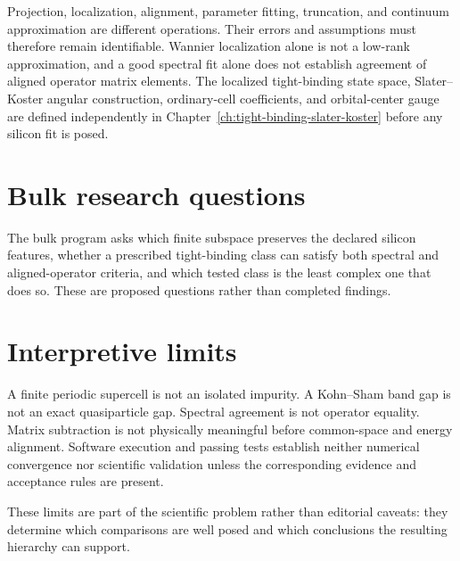 Projection, localization, alignment, parameter fitting, truncation, and
continuum approximation are different operations. Their errors and assumptions
must therefore remain identifiable. Wannier localization alone is not a
low-rank approximation, and a good spectral fit alone does not establish
agreement of aligned operator matrix elements. The localized tight-binding
state space, Slater--Koster angular construction, ordinary-cell coefficients,
and orbital-center gauge are defined independently in
Chapter~\ref{ch:tight-binding-slater-koster} before any silicon fit is posed.

\section{Bulk research questions}


The bulk program asks which finite subspace preserves the declared silicon
features, whether a prescribed tight-binding class can satisfy both spectral
and aligned-operator criteria, and which tested class is the least complex one
that does so. These are proposed questions rather than completed findings.

\section{Interpretive limits}

A finite periodic supercell is not an isolated impurity. A Kohn--Sham band gap
is not an exact quasiparticle gap. Spectral agreement is not operator equality.
Matrix subtraction is not physically meaningful before common-space and
energy alignment. Software execution and passing tests establish neither
numerical convergence nor scientific validation unless the corresponding
evidence and acceptance rules are present.


These limits are part of the scientific problem rather than editorial caveats:
they determine which comparisons are well posed and which conclusions the
resulting hierarchy can support.
